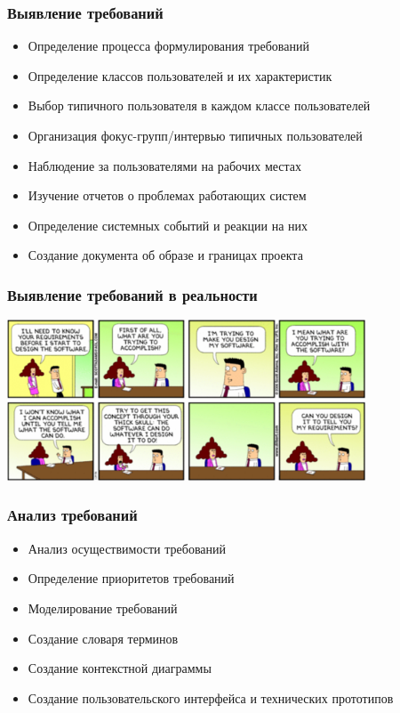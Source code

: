 \documentclass{../../slides-style}
\begin{document}
    \begin{frame}
        \frametitle{Выявление требований}
        \begin{itemize}
            \item Определение процесса формулирования требований
            \item Определение классов пользователей и их характеристик
            \item Выбор типичного пользователя в каждом классе пользователей
            \item Организация фокус-групп/интервью типичных пользователей
            \item Наблюдение за пользователями на рабочих местах
            \item Изучение отчетов о проблемах работающих систем
            \item Определение системных событий и реакции на них
            \item Создание документа об образе и границах проекта
        \end{itemize}
    \end{frame}

    \begin{frame}
        \frametitle{Выявление требований в реальности}
        \begin{center}
            \includegraphics[width=0.8\textwidth]{aliceAndRequirements.png}
        \end{center}
    \end{frame}

    \begin{frame}
        \frametitle{Анализ требований}
        \begin{itemize}
            \item Анализ осуществимости требований
            \item Определение приоритетов требований
            \item Моделирование требований
            \item Создание словаря терминов
            \item Создание контекстной диаграммы
            \item Создание пользовательского интерфейса и технических прототипов
        \end{itemize}
    \end{frame}
\end{document}
